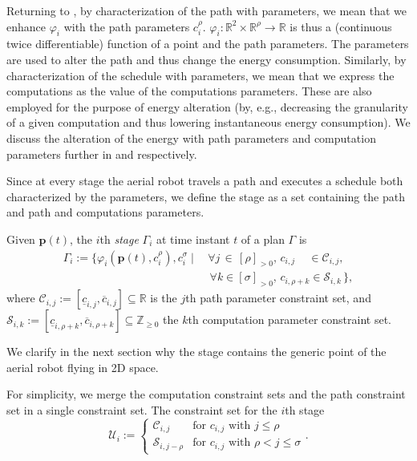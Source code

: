 Returning to , by characterization of the path with parameters, we mean that we enhance $\varphi_i$ with the path parameters $c_i^\rho$. $\varphi_i:\mathbb{R}^2\times\mathbb{R}^\rho\rightarrow\mathbb{R}$ is thus a (continuous twice differentiable) function of a point and the path parameters. The parameters are used to alter the path and thus change the energy consumption.
Similarly, by characterization of the schedule with parameters, we mean that we express the computations as the value of the computations parameters. These are also employed for the purpose of energy alteration (by, e.g., decreasing the granularity of a given computation and thus lowering instantaneous energy consumption). We discuss the alteration of the energy with path parameters and computation parameters further in  and  respectively.

Since at every stage the aerial robot travels a path and executes a schedule both characterized by the parameters, we define the stage as a set containing the path and path and computations parameters.

\begin{highlight}  
  \begin{defn}[Stage]\label{def:stage}
    Given $\mathbf{p}(t)$, the $i$th \emph{stage} $\Gamma_i$ at time instant $t$ of a plan $\Gamma$ is
    \begin{equation*}\begin{split}
      \Gamma_i:=\{\varphi_i(\mathbf{p}(t),c_i^\rho),c_i^\sigma\mid
      \,&\forall j\,\in\,[\rho]_{>0},\,c_{i,j}\,\,\,\,\,\,\,\in\mathcal{C}_{i,j},\,\\
        &\,\forall k\in[\sigma]_{>0},\,c_{i,\rho+k}\in\mathcal{S}_{i,k}\,\},
    \end{split}\end{equation*}
    where $\mathcal{C}_{i,j}:=[\underline{c}_{i,j},\overline{c}_{i,j}]\subseteq\mathbb{R}$ is the $j$th path parameter constraint set, and $\mathcal{S}_{i,k}:=[\underline{c}_{i,\rho+k},\overline{c}_{i,\rho+k}]\subseteq\mathbb{Z}_{\geq 0}$ the $k$th computation parameter constraint set.
  \end{defn}
\end{highlight}

We clarify in the next section why the stage contains the generic point of the aerial robot flying in 2D space.

For simplicity, we merge the computation constraint sets and the path constraint set in a single constraint set. The constraint set for the $i$th stage
\begin{equation}\label{eq:constraint-set}
  \mathcal{U}_i:=\begin{cases}
  \mathcal{C}_{i,j} & \text{for } c_{i,j} \text{ with } j\leq\rho\\
  \mathcal{S}_{i,j-\rho} & \text{for } c_{i,j} \text{ with } \rho<j\leq\sigma
\end{cases}.\end{equation}

